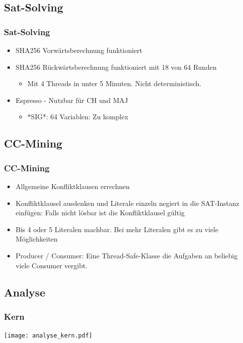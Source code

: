 \documentclass{beamer}
\begin{document}
\subsection{Sat-Solving}
  \begin{frame}
    \frametitle{Sat-Solving}
    \begin{itemize}
      \item SHA256 Vorwärtsberechnung funktioniert
      \item SHA256 Rückwärtsberechnung \newline funktioniert mit 18 von 64 Runden
      \begin{itemize}
        \item Mit 4 Threads in unter 5 Minuten. Nicht deterministisch.
      \end{itemize}
      \item Espresso - Nutzbar für CH und MAJ
      \begin{itemize}
        \item *SIG*: 64 Variablen: Zu komplex
      \end{itemize}
    \end{itemize}
  \end{frame}
\subsection{CC-Mining}
  \begin{frame}
    \frametitle{CC-Mining}
    \begin{itemize}
     \item Allgemeine Konfliktklausen errechnen
     \item Konfliktklausel ausdenken und Literale einzeln negiert in die SAT-Instanz einfügen: Falls nicht lösbar ist die Konfliktklausel gültig
     \item Bis 4 oder 5 Literalen machbar. Bei mehr Literalen gibt es zu viele Möglichkeiten
     \item Producer / Consumer: Eine Thread-Safe-Klasse die Aufgaben an beliebig viele Consumer vergibt.
    \end{itemize}
  \end{frame}
\subsection{Analyse}
  \begin{frame}
    \frametitle{Kern}
    \texttt{[image: analyse\_kern.pdf]}
  \end{frame}
\end{document}
